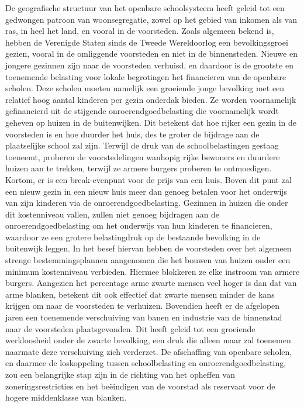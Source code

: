\documentclass[
  a5paper,
  smalldemyvopaper,10pt,twoside,onecolumn,openright,extrafontsizes,hidelinks]{memoir}
\begin{document}
De geografische structuur van het openbare schoolsysteem heeft geleid
tot een gedwongen patroon van woonsegregatie, zowel op het gebied van
inkomen als van ras, in heel het land, en vooral in de voorsteden. Zoals
algemeen bekend is, hebben de Verenigde Staten sinds de Tweede
Wereldoorlog een bevolkingsgroei gezien, vooral in de omliggende
voorsteden en niet in de binnensteden. Nieuwe en jongere gezinnen zijn
naar de voorsteden verhuisd, en daardoor is de grootste en toenemende
belasting voor lokale begrotingen het financieren van de openbare
scholen. Deze scholen moeten namelijk een groeiende jonge bevolking met
een relatief hoog aantal kinderen per gezin onderdak bieden. Ze worden
voornamelijk gefinancierd uit de stijgende onroerendgoedbelasting die
voornamelijk wordt geheven op huizen in de buitenwijken. Dit betekent
dat hoe rijker een gezin in de voorsteden is en hoe duurder het huis,
des te groter de bijdrage aan de plaatselijke school zal zijn. Terwijl
de druk van de schoolbelastingen gestaag toeneemt, proberen de
voorstedelingen wanhopig rijke bewoners en duurdere huizen aan te
trekken, terwijl ze armere burgers proberen te ontmoedigen. Kortom, er
is een break-evenpunt voor de prijs van een huis. Boven dit punt zal een
nieuw gezin in een nieuw huis meer dan genoeg betalen voor het onderwijs
van zijn kinderen via de onroerendgoedbelasting. Gezinnen in huizen die
onder dit kostenniveau vallen, zullen niet genoeg bijdragen aan de
onroerendgoedbelasting om het onderwijs van hun kinderen te financieren,
waardoor ze een grotere belastingdruk op de bestaande bevolking in de
buitenwijk leggen. In het besef hiervan hebben de voorsteden over het
algemeen strenge bestemmingsplannen aangenomen die het bouwen van huizen
onder een minimum kostenniveau verbieden. Hiermee blokkeren ze elke
instroom van armere burgers. Aangezien het percentage arme zwarte mensen
veel hoger is dan dat van arme blanken, betekent dit ook effectief dat
zwarte mensen minder de kans krijgen om naar de voorsteden te verhuizen.
Bovendien heeft er de afgelopen jaren een toenemende verschuiving van
banen en industrie van de binnenstad naar de voorsteden plaatsgevonden.
Dit heeft geleid tot een groeiende werkloosheid onder de zwarte
bevolking, een druk die alleen maar zal toenemen naarmate deze
verschuiving zich verderzet. De afschaffing van openbare scholen, en
daarmee de loskoppeling tussen schoolbelasting en
onroerendgoedbelasting, zou een belangrijke stap zijn in de richting van
het opheffen van zoneringsrestricties en het beëindigen van de voorstad
als reservaat voor de hogere middenklasse van blanken.
\end{document}
